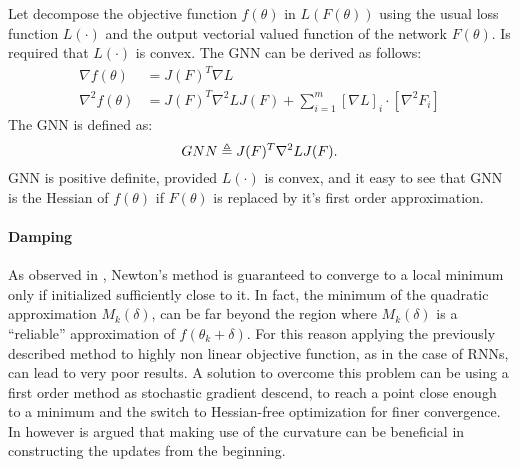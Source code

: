 Let decompose the objective function $f(\theta)$ in $L(F(\theta))$ using the usual loss function $L(\cdot)$ and the output  vectorial valued function of the network $F(\theta)$. Is required that $L(\cdot)$ is convex. The GNN can be derived as follows:
\begin{align}
 \nabla f(\theta) &= J(F)^T\nabla L \\
 \nabla^2f(\theta) &= J(F)^T\nabla^2L J(F) + \sum_{i=1}^m[\nabla L]_i \cdot [\nabla^2 F_i]
\end{align}
The GNN is defined as:
\begin{equation}
 GNN \triangleq J(F)^T\nabla^2L J(F).
\end{equation}
GNN is positive definite, provided $L(\cdot)$ is convex, and it easy to see that GNN is the Hessian of $f(\theta)$ if $F(\theta)$ is replaced by it's first order approximation.

\paragraph{Damping}

As observed in \cite{hessianFree}, Newton's method is guaranteed to converge to a local minimum only if initialized sufficiently close to it.
In fact, the minimum of the quadratic approximation $M_k(\delta)$, can be far beyond the region where $M_k(\delta)$ is  a ``reliable'' approximation of $f(\theta_k+\delta)$.
For this reason applying the previously described method to highly non linear objective function, as in the case of RNNs, can lead to very poor results.
A solution to overcome this problem can be using a first order method as stochastic gradient descend, to reach a point close enough to a minimum and the switch to Hessian-free optimization for finer convergence. In \cite{hessianFree} however is argued that making use of the curvature can be beneficial in constructing the updates from the beginning.

